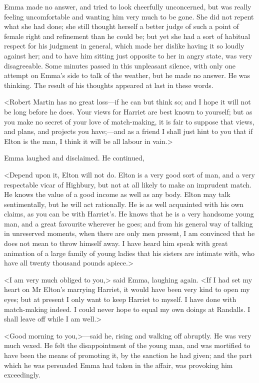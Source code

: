 Emma made no answer, and tried to look cheerfully unconcerned, but was really feeling uncomfortable and wanting him very much to be gone. She did not repent what she had done; she still thought herself a better judge of such a point of female right and refinement than he could be; but yet she had a sort of habitual respect for his judgment in general, which made her dislike having it so loudly against her; and to have him sitting just opposite to her in angry state, was very disagreeable. Some minutes passed in this unpleasant silence, with only one attempt on Emma's side to talk of the weather, but he made no answer. He was thinking. The result of his thoughts appeared at last in these words.

<Robert Martin has no great loss—if he can but think so; and I hope it will not be long before he does. Your views for Harriet are best known to yourself; but as you make no secret of your love of match-making, it is fair to suppose that views, and plans, and projects you have;—and as a friend I shall just hint to you that if Elton is the man, I think it will be all labour in vain.>

Emma laughed and disclaimed. He continued,

<Depend upon it, Elton will not do. Elton is a very good sort of man, and a very respectable vicar of Highbury, but not at all likely to make an imprudent match. He knows the value of a good income as well as any body. Elton may talk sentimentally, but he will act rationally. He is as well acquainted with his own claims, as you can be with Harriet's. He knows that he is a very handsome young man, and a great favourite wherever he goes; and from his general way of talking in unreserved moments, when there are only men present, I am convinced that he does not mean to throw himself away. I have heard him speak with great animation of a large family of young ladies that his sisters are intimate with, who have all twenty thousand pounds apiece.>

<I am very much obliged to you,> said Emma, laughing again. <If I had set my heart on Mr Elton's marrying Harriet, it would have been very kind to open my eyes; but at present I only want to keep Harriet to myself. I have done with match-making indeed. I could never hope to equal my own doings at Randalls. I shall leave off while I am well.>

<Good morning to you,>—said he, rising and walking off abruptly. He was very much vexed. He felt the disappointment of the young man, and was mortified to have been the means of promoting it, by the sanction he had given; and the part which he was persuaded Emma had taken in the affair, was provoking him exceedingly.

